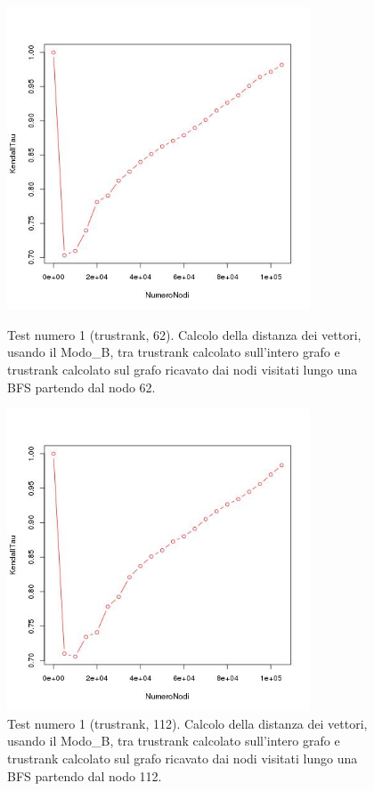  \begin{figure}
\centering
 \includegraphics[height=9cm]{immagini/test1/trustranktestMode1_62}
 \caption{Test numero 1 (trustrank, 62). Calcolo della distanza dei vettori, usando il Modo\_B, tra trustrank calcolato sull'intero grafo e trustrank calcolato sul grafo ricavato dai nodi visitati lungo una BFS partendo dal nodo 62.}
 \label{fig:test1trustModoB62}
\centering
 \includegraphics[height=9cm]{immagini/test1/trustranktestMode1_112}
 \caption{Test numero 1 (trustrank, 112). Calcolo della distanza dei vettori, usando il Modo\_B, tra trustrank calcolato sull'intero grafo e trustrank calcolato sul grafo ricavato dai nodi visitati lungo una BFS partendo dal nodo 112.}
 \label{fig:test1trustModoB112}
\end{figure}

